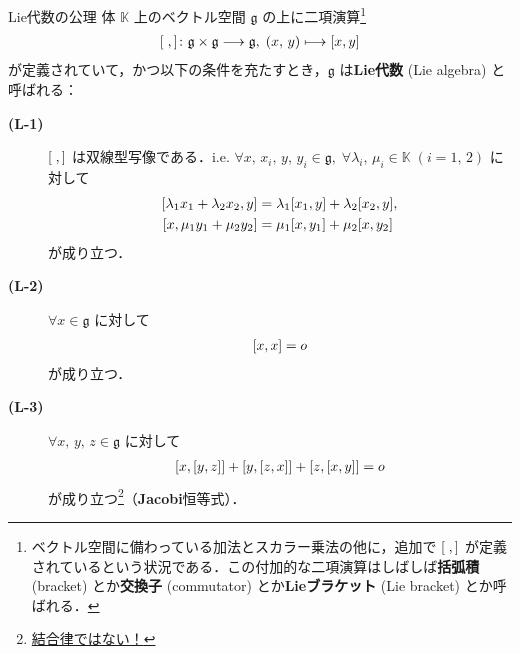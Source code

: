 \documentclass[rep_main]{subfiles}
\begin{document}
\begin{myaxiom}[label=ax:LieAlg, breakable]{Lie代数の公理}
    体 $\mathbb{K}$ 上のベクトル空間 $\mathfrak{g}$ の上に二項演算\footnote{ベクトル空間に備わっている加法とスカラー乗法の他に，追加で $\comm{\;}{\,}$ が定義されているという状況である．この付加的な二項演算はしばしば\textbf{括弧積} (bracket) とか\textbf{交換子} (commutator) とか\textbf{Lieブラケット} (Lie bracket) とか呼ばれる．}
    \begin{align}
        \comm{\;}{\,} \colon \mathfrak{g} \times \mathfrak{g} \lto \mathfrak{g},\; (x,\, y) \lmto \comm{x}{y}
    \end{align}
    が定義されていて，かつ以下の条件を充たすとき，$\mathfrak{g}$ は\textbf{Lie代数} (Lie algebra) と呼ばれる：
    \begin{description}
        \item[\textbf{(L-1)}] $\comm{\;}{\,}$ は双線型写像である．i.e. $\forall x,\, x_i,\, y,\, y_i \in \mathfrak{g},\; \forall \lambda_i,\, \mu_i \in \mathbb{K}\; (i = 1,\, 2)$ に対して
        \begin{align}
            \comm{\lambda_1 x_1 + \lambda_2 x_2}{y} &= \lambda_1 \comm{x_1}{y} + \lambda_2 \comm{x_2}{y}, \\
            \comm{x}{\mu_1 y_1 + \mu_2 y_2} &= \mu_1 \comm{x}{y_1} + \mu_2 \comm{x}{y_2}
        \end{align}
        が成り立つ．
        \item[\textbf{(L-2)}] $\forall x \in \mathfrak{g}$ に対して
        \begin{align}
            \comm{x}{x} = o
        \end{align}
        が成り立つ．
        \item[\textbf{(L-3)}] $\forall x,\, y,\, z \in \mathfrak{g}$ に対して
        \begin{align}
            \label{eq:Jacobi-identity}
            \comm{x}{\comm{y}{z}} + \comm{y}{\comm{z}{x}} + \comm{z}{\comm{x}{y}} = o
        \end{align}
        が成り立つ\footnote{\underline{結合律ではない！}}（\textbf{Jacobi}恒等式）．
    \end{description}
    
\end{myaxiom}
\end{document}
